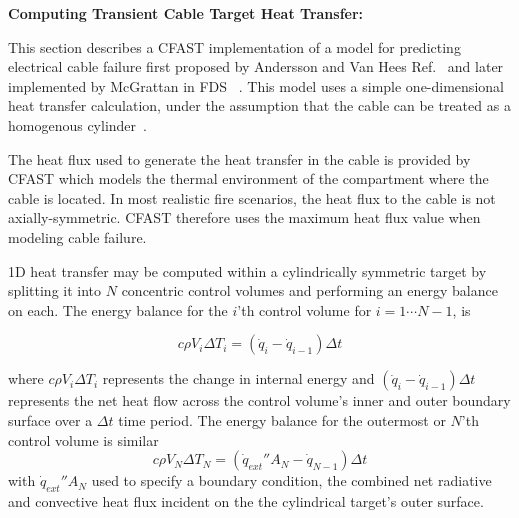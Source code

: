 {\bf Computing Transient Cable Target Heat Transfer:}

\newcommand{\Dt}{\Delta t}
\newcommand{\Dr}{\Delta r}
\newcommand{\Tipo}{T_{i+1}^{n+1}}
\newcommand{\Ti}{T_{i}^{n+1}}
\newcommand{\Timo}{T_{i-1}^{n+1}}

This section describes a CFAST implementation of a model for
predicting electrical cable failure first proposed
by Andersson and Van Hees Ref.~\cite{Andersson:2005}
and later implemented by McGrattan
in FDS~\cite{CAROLFIRE} .  This model uses a simple one-dimensional heat
transfer calculation, under the assumption that the cable can
be treated as a homogenous cylinder~\cite{Andersson:2005}.

The heat flux used to generate the heat transfer in the cable is provided
by CFAST which models the thermal environment of the compartment where
the cable is located.  In most realistic fire  scenarios, the heat flux
to the cable is not axially-symmetric.  CFAST therefore uses the maximum
heat flux value when modeling cable failure.

1D heat transfer may be computed within a cylindrically symmetric target
by splitting it into $N$ concentric control volumes and performing
an energy balance on each.  The energy balance for the $i$'th control
volume for $i=1\cdots N-1$, is

\begin{equation}
c\rho V_i\Delta T_i=(\dot{q}_i-\dot{q}_{i-1})\Dt
\label{eq:cylheat1}
\end{equation}

\noindent where $c\rho V_i\Delta T_i$ represents the change in internal
energy
and $(\dot{q}_i-\dot{q}_{i-1})\Dt$ represents the net heat flow across the
control volume's inner and outer boundary surface over a $\Dt$ time period.
The energy balance for the outermost or $N$'th control volume is similar
\begin{equation}
c\rho V_N\Delta T_N=(\dot{q}_{ext}''A_N-\dot{q}_{N-1})\Dt
\label{eq:cylheat2}
\end{equation}
with $\dot{q}_{ext}''A_N$ used to specify a boundary condition,
the combined net radiative and convective heat flux incident
on the the cylindrical target's outer surface.

